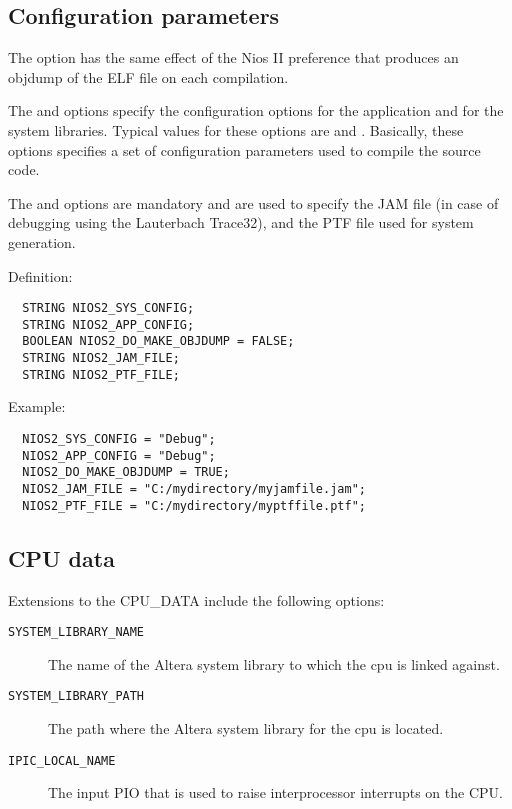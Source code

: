 \subsection{Configuration parameters}

The  option has the same effect of the
Nios II preference that produces an objdump of the ELF file on each
compilation.

The  and  options
specify the configuration options for the application and for the
system libraries. Typical values for these options are 
and . Basically, these options specifies a set of
configuration parameters used to compile the source code.

The  and  options are
mandatory and are used to specify the JAM file (in case of debugging
using the Lauterbach Trace32), and the PTF file used for system
generation.

Definition:

\begin{lstlisting}
  STRING NIOS2_SYS_CONFIG;
  STRING NIOS2_APP_CONFIG;
  BOOLEAN NIOS2_DO_MAKE_OBJDUMP = FALSE;
  STRING NIOS2_JAM_FILE;
  STRING NIOS2_PTF_FILE;
\end{lstlisting}

Example:

\begin{lstlisting}
  NIOS2_SYS_CONFIG = "Debug";
  NIOS2_APP_CONFIG = "Debug";
  NIOS2_DO_MAKE_OBJDUMP = TRUE;
  NIOS2_JAM_FILE = "C:/mydirectory/myjamfile.jam";
  NIOS2_PTF_FILE = "C:/mydirectory/myptffile.ptf";
\end{lstlisting}


\subsection{CPU data}

Extensions to the CPU\_DATA include the following options:

\begin{description}
\item [{\tt SYSTEM\_LIBRARY\_NAME}] The name of the Altera system
  library to which the cpu is linked against.

\item [{\tt SYSTEM\_LIBRARY\_PATH}] The path where the Altera system
  library for the cpu is located.

\item [{\tt IPIC\_LOCAL\_NAME}] The input PIO that is used to raise
  interprocessor interrupts on the CPU.
\end{description}

